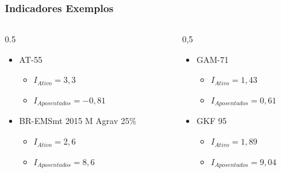 \documentclass[11pt]{beamer}
\begin{document}
    \begin{frame}
        \frametitle{Indicadores Exemplos}

        \begin{columns}

            \begin{column}{0.5\textwidth}
                \begin{itemize}
                    \item AT-55
                    \begin{itemize}
                        \item[$-$] $I_{Ativo} = 3,3$
                        \item[$-$] $I_{Aposentados} = -0,81$
                    \end{itemize}

                    \item BR-EMSmt 2015 M Agrav 25\%
                    \begin{itemize}
                        \item[$-$] $I_{Ativo} = 2,6$
                        \item[$-$] $I_{Aposentados} =  8,6$
                    \end{itemize}
                \end{itemize}
            \end{column}

            \begin{column}{0,5\textwidth}
                \begin{itemize}
                    \item GAM-71
                    \begin{itemize}
                        \item[$-$] $I_{Ativo} = 1,43$
                        \item[$-$] $I_{Aposentados} = 0,61$
                    \end{itemize}
                    
                    \item GKF 95
                    \begin{itemize}
                        \item[$-$] $I_{Ativo} = 1,89$
                        \item[$-$] $I_{Aposentados} =  9,04$
                    \end{itemize}
                \end{itemize}
            \end{column}

        \end{columns}

    \end{frame}
\end{document}

